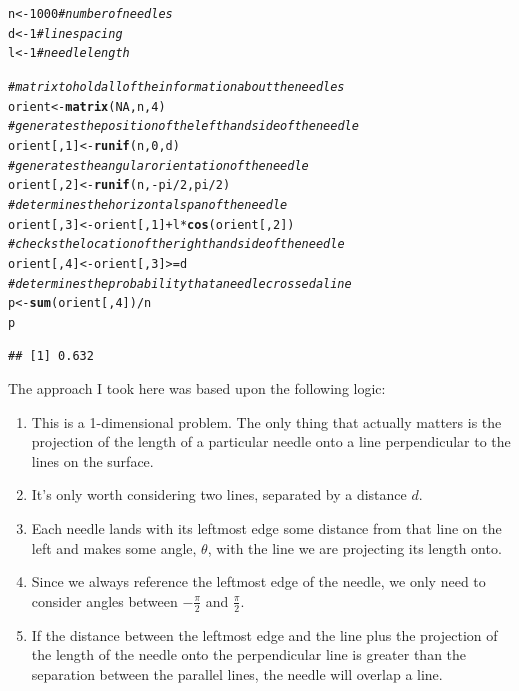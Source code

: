 \documentclass[letterpaper,12pt]{article}\usepackage[]{graphicx}\usepackage[]{color}
\makeatletter
\newcommand{\hlnum}[1]{\textcolor[rgb]{0.686,0.059,0.569}{#1}}%
\newcommand{\hlcom}[1]{\textcolor[rgb]{0.678,0.584,0.686}{\textit{#1}}}%
\newcommand{\hlopt}[1]{\textcolor[rgb]{0,0,0}{#1}}%
\newcommand{\hlstd}[1]{\textcolor[rgb]{0.345,0.345,0.345}{#1}}%
\newcommand{\hlkwb}[1]{\textcolor[rgb]{0.69,0.353,0.396}{#1}}%
\newcommand{\hlkwd}[1]{\textcolor[rgb]{0.737,0.353,0.396}{\textbf{#1}}}%
\newenvironment{kframe}{%
 \def\at@end@of@kframe{}%
 \ifinner\ifhmode%
  \def\at@end@of@kframe{\end{minipage}}%
  \begin{minipage}{\columnwidth}%
 \fi\fi%
 \def\FrameCommand##1{\hskip\@totalleftmargin \hskip-\fboxsep
 \colorbox{shadecolor}{##1}\hskip-\fboxsep
     \hskip-\linewidth \hskip-\@totalleftmargin \hskip\columnwidth}%
 \MakeFramed {\advance\hsize-\width
   \@totalleftmargin\z@ \linewidth\hsize
   \@setminipage}}%
 {\par\unskip\endMakeFramed%
 \at@end@of@kframe}
\newenvironment{knitrout}{}{} %
\numberwithin{equation}{section}
\makeatother
\begin{document}
\begin{knitrout}
\color{fgcolor}\begin{kframe}
\begin{alltt}
\hlstd{n} \hlkwb{<-} \hlnum{1000} \hlcom{#number of needles}
\hlstd{d} \hlkwb{<-} \hlnum{1} \hlcom{#line spacing}
\hlstd{l} \hlkwb{<-} \hlnum{1} \hlcom{#needle length}

\hlcom{#matrix to hold all of the information about the needles}
\hlstd{orient} \hlkwb{<-} \hlkwd{matrix}\hlstd{(}\hlnum{NA}\hlstd{,n,}\hlnum{4}\hlstd{)}
\hlcom{#generates the position of the lefthand side of the needle}
\hlstd{orient[,}\hlnum{1}\hlstd{]} \hlkwb{<-} \hlkwd{runif}\hlstd{(n,}\hlnum{0}\hlstd{,d)}
\hlcom{#generates the angular orientation of the needle}
\hlstd{orient[,}\hlnum{2}\hlstd{]} \hlkwb{<-} \hlkwd{runif}\hlstd{(n,}\hlopt{-}\hlstd{pi}\hlopt{/}\hlnum{2}\hlstd{, pi}\hlopt{/}\hlnum{2}\hlstd{)}
\hlcom{#determines the horizontal span of the needle}
\hlstd{orient[,}\hlnum{3}\hlstd{]} \hlkwb{<-} \hlstd{orient[,}\hlnum{1}\hlstd{]}\hlopt{+}\hlstd{l}\hlopt{*}\hlkwd{cos}\hlstd{(orient[,}\hlnum{2}\hlstd{])}
\hlcom{#checks the location of the righthand side of the needle}
\hlstd{orient[,}\hlnum{4}\hlstd{]} \hlkwb{<-} \hlstd{orient[,}\hlnum{3}\hlstd{]} \hlopt{>=} \hlstd{d}
\hlcom{#determines the probability that a needle crossed a line}
\hlstd{p} \hlkwb{<-} \hlkwd{sum}\hlstd{(orient[,}\hlnum{4}\hlstd{])}\hlopt{/}\hlstd{n}
\hlstd{p}
\end{alltt}
\begin{verbatim}
## [1] 0.632
\end{verbatim}
\end{kframe}
\end{knitrout}

The approach I took here was based upon the following logic:
\begin{enumerate}
  \item This is a 1-dimensional problem.  The only thing that actually matters is the projection of the length of a particular needle onto a line perpendicular to the lines on the surface.
  \item It's only worth considering two lines, separated by a distance $d$.  
  \item Each needle lands with its leftmost edge some distance from that line on the left and makes some angle, $\theta$, with the line we are projecting its length onto.
  \item Since we always reference the leftmost edge of the needle, we only need to consider angles between $-\frac{\pi}{2}$ and $\frac{\pi}{2}$.
  \item If the distance between the leftmost edge and the line plus the projection of the length of the needle onto the perpendicular line is greater than the separation between the parallel lines, the needle will overlap a line.
\end{enumerate}
\end{document}
